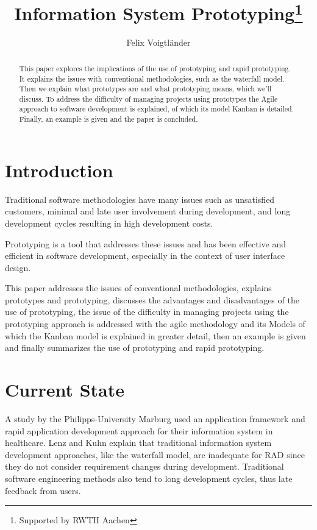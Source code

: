 \documentclass[runningheads]{llncs}
\begin{document}
%
\title{Information System Prototyping\thanks{Supported by RWTH Aachen}}
%
%
\author{Felix Voigtländer}
%
%
%
\maketitle              %
%
\begin{abstract}
This paper explores the implications of the use of prototyping and rapid prototyping.
It explains the issues with conventional methodologies, such as the waterfall model.
Then we explain what prototypes are and what prototyping means, which we'll discuss.
To address the difficulty of managing projects using prototypes the Agile approach
to software development is explained, of which its model Kanban is detailed.
Finally, an example is given and the paper is concluded.

\end{abstract}
%
%
%
\section{Introduction}
Traditional software methodologies have many issues such as unsatisfied customers,
minimal and late user involvement during development, and long development cycles resulting
in high development costs.

Prototyping is a tool that addresses these issues and has been effective and efficient
in software development, especially in the context of user interface design.

This paper addresses the issues of conventional methodologies, explains prototypes and prototyping,
discusses the advantages and disadvantages of the use of prototyping, the issue of the difficulty in
managing projects using the prototyping approach is addressed with the agile methodology
and its Models of which the Kanban model is explained in greater detail,
then an example is given and finally summarizes the use of prototyping and rapid prototyping.

\section{Current State}
A study by the Philipps-University Marburg \cite{ref_health} used an application framework and
rapid application development approach for their information system in healthcare.
Lenz and Kuhn\cite{ref_health} explain that traditional information system development approaches, like
the waterfall model, are inadequate for RAD since they do not consider requirement changes during development. 
Traditional software engineering methods also tend to long development cycles, thus late feedback from users.
\end{document}
